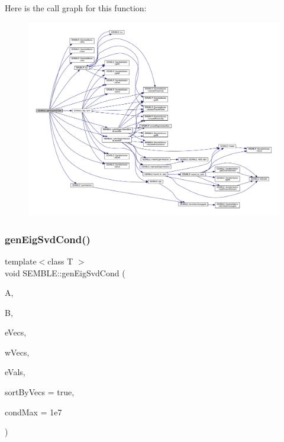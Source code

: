 Here is the call graph for this function\+:
\nopagebreak
\begin{figure}[H]
\begin{center}
\leavevmode
\includegraphics[width=350pt]{d7/dfd/namespaceSEMBLE_a9dcee3599c76380594ebea593dc26a15_cgraph}
\end{center}
\end{figure}
\mbox{\label{namespaceSEMBLE_abef6ebd7bb063b0d69ba782471f9e4a5}} 
\subsubsection{\texorpdfstring{genEigSvdCond()}{genEigSvdCond()}}
{\footnotesize\ttfamily template$<$class T $>$ \\
void S\+E\+M\+B\+L\+E\+::gen\+Eig\+Svd\+Cond (\begin{DoxyParamCaption}\item[{const \mbox{\hyperlink{structSEMBLE_1_1SembleMatrix}{Semble\+Matrix}}$<$ T $>$ \&}]{A,  }\item[{const \mbox{\hyperlink{structSEMBLE_1_1SembleMatrix}{Semble\+Matrix}}$<$ T $>$ \&}]{B,  }\item[{\mbox{\hyperlink{structSEMBLE_1_1SembleMatrix}{Semble\+Matrix}}$<$ T $>$ \&}]{e\+Vecs,  }\item[{\mbox{\hyperlink{structSEMBLE_1_1SembleMatrix}{Semble\+Matrix}}$<$ T $>$ \&}]{w\+Vecs,  }\item[{\mbox{\hyperlink{structSEMBLE_1_1SembleVector}{Semble\+Vector}}$<$ double $>$ \&}]{e\+Vals,  }\item[{const bool}]{sort\+By\+Vecs = {\ttfamily true},  }\item[{const double}]{cond\+Max = {\ttfamily 1e7} }\end{DoxyParamCaption})}

